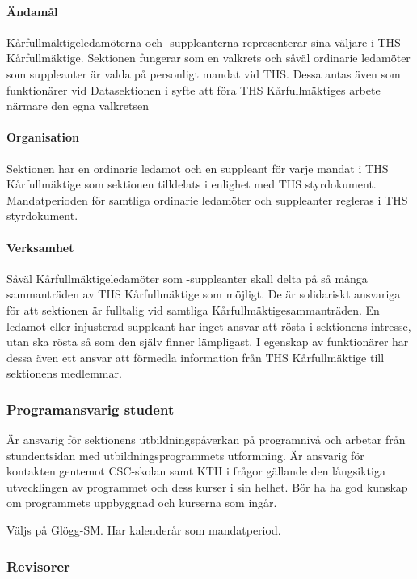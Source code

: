 \documentclass{dgovdoc}
\begin{document}
\paragraph{Ändamål}

Kårfullmäktigeledamöterna och -suppleanterna representerar sina väljare i
THS Kårfullmäktige. Sektionen fungerar som en valkrets och såväl ordinarie ledamöter
som suppleanter är valda på personligt mandat vid THS. Dessa antas även som funktionärer
vid Datasektionen i syfte att föra THS Kårfullmäktiges arbete närmare den
egna valkretsen

\paragraph{Organisation}

Sektionen har en ordinarie ledamot och en suppleant för varje mandat i THS Kårfullmäktige
som sektionen tilldelats i enlighet med THS styrdokument. Mandatperioden för samtliga
ordinarie ledamöter och suppleanter regleras i THS styrdokument.

\paragraph{Verksamhet}

Såväl Kårfullmäktigeledamöter som -suppleanter skall delta på så många sammanträden
av THS Kårfullmäktige som möjligt. De är solidariskt ansvariga för att sektionen
är fulltalig vid samtliga Kårfullmäktigesammanträden. En ledamot eller injusterad suppleant
har inget ansvar att rösta i sektionens intresse, utan ska rösta så som den själv
finner lämpligast. I egenskap av funktionärer har dessa även ett ansvar att förmedla
information från THS Kårfullmäktige till sektionens medlemmar.

\subsubsection{Programansvarig student}

Är ansvarig för sektionens
utbildningspåverkan på programnivå och arbetar från stundentsidan med utbildningsprogrammets
utformning. Är ansvarig för kontakten gentemot CSC-skolan samt KTH
i frågor gällande den långsiktiga utvecklingen av programmet och dess kurser i sin helhet.
Bör ha ha god kunskap om programmets uppbyggnad och kurserna som ingår.

Väljs på Glögg-SM. Har kalenderår som mandatperiod.

\subsubsection{Revisorer}
\end{document}
